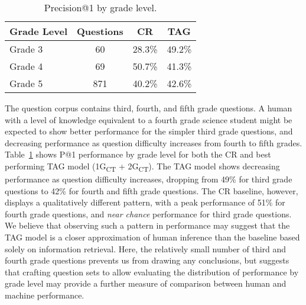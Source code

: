 %
%
\begin{table}[t]
\caption{{ Precision@1 by grade level. }} %
\small
\begin{center}
\begin{tabular}{lccc}
\hline
\multicolumn{1}{c}{Grade Level} & \multicolumn{1}{c}{Questions} &\multicolumn{1}{c}{CR} & \multicolumn{1}{c}{TAG}  \\
\cline{2-3}
\hline
Grade 3 	& 60		&	28.3\%		& 49.2\%	\\
Grade 4		& 69 	&	50.7\%		& 41.3\%	\\
Grade 5		& 871	&	40.2\%		& 42.6\%	\\

\end{tabular}
\label{tab:gradelevel}
\end{center}
\end{table}


{} The question corpus contains third, fourth, and fifth grade questions.  A human with a level of knowledge equivalent to a fourth grade science student might be expected to show better performance for the simpler third grade questions, and decreasing performance as question difficulty increases from fourth to fifth grades.  Table~\ref{tab:gradelevel} shows P@1 performance by grade level for both the CR and best performing TAG model (1G\textsubscript{CT} + 2G\textsubscript{CT}).  The TAG model shows decreasing performance as question difficulty increases, dropping from 49\% for third grade questions to 42\% for fourth and fifth grade questions.  The CR baseline, however, displays a qualitatively different pattern, with a peak performance of 51\% for fourth grade questions, and {\em near chance} performance for third grade questions. 
We believe that observing such a pattern in performance may suggest that the TAG model is a closer approximation of human inference than the baseline based solely on information retrieval.  Here, the relatively small number of third and fourth grade questions prevents us from drawing any conclusions, but suggests that crafting question sets to allow evaluating the distribution of performance by grade level may provide a further measure of comparison between human and machine performance. 



